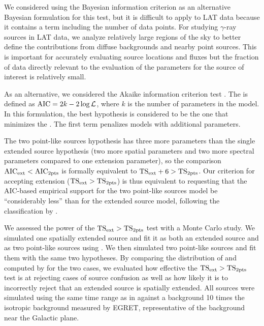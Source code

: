 We considered using 
the Bayesian information criterion \citep[BIC,][]{schwarz_1978a_estimating-dimension} as
an alternative Bayesian formulation for this test, but it is difficult to apply
to LAT data because it contains a term including the number of data points. 
For studying $\gamma$-ray sources in LAT data, we analyze relatively large
regions of the sky to better define the contributions from diffuse
backgrounds and nearby point sources. This is important for accurately
evaluating source locations and fluxes but the fraction of data directly
relevant to the evaluation of the parameters for the source of interest
is relatively small.

As an alternative, we considered the Akaike information criterion test \citep[\aic,][]{akaike_1974a_statistical-model}.
The \aic is defined as $\text{AIC}=2k-2\log\mathcal{L}$, where $k$ is the number of parameters in the model. 
In this formulation, the best hypothesis is considered to be the one that minimizes the \aic.
The first term penalizes models with additional parameters. 

The two point-like sources hypothesis has three more parameters than
the single extended source hypothesis (two more spatial parameters and
two more spectral parameters compared to one extension parameter), so the
comparison $\text{AIC}_\text{ext} < \text{AIC}_\text{2pts}$  is formally equivalent to
$\mathrm{TS}_\mathrm{ext} + 6 > \mathrm{TS}_{\mathrm{2pts}}$.  Our criterion for accepting extension ($\mathrm{TS}_\mathrm{ext} > \mathrm{TS}_{\mathrm{2pts}}$) 
is thus equivalent to requesting that the AIC-based empirical
support for the two point-like sources model be ``considerably less''
than for the extended source model, following the classification by
\cite{burnham_2002a_model-selection}.

We assessed the power of the $\mathrm{TS}_\mathrm{ext}>\mathrm{TS}_{\mathrm{2pts}}$ test with a Monte Carlo
study.  We simulated one spatially extended source and fit it as both
an extended source and as two point-like sources using \pointlike.
We then simulated two point-like sources and fit them with the same two
hypotheses. By comparing the distribution of \tsinc and \tsext computed by
\pointlike for the two cases, we evaluated how effective the $\mathrm{TS}_\mathrm{ext}>\mathrm{TS}_{\mathrm{2pts}}$
test is at rejecting cases of source confusion as well as how
likely it is to incorrectly reject that an extended source is spatially
extended.  All sources were simulated using the same time range as in
 against a background 10 times the
isotropic background measured by EGRET, representative of the background
near the Galactic plane.

